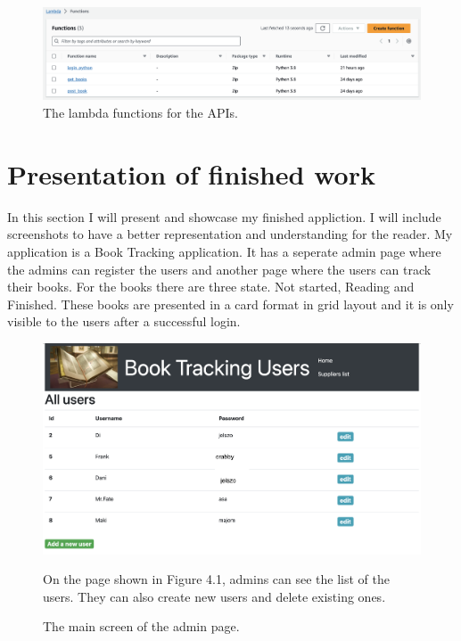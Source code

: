 \documentclass[11pt,a4paper,oneside]{report}
\begin{document}
\begin{figure}[!ht]
  \centering
  \includegraphics[scale=0.4]{lambda_functions.png}
  \caption{The lambda functions for the APIs.}
  \label{fig:TexnicCenter}
\end{figure}


\chapter{Presentation of finished work}

In this section I will present and showcase my finished appliction.
I will include screenshots to have a better representation and understanding for the reader.
My application is a Book Tracking application. It has a seperate admin page where the admins can register the users and another page where the users can track their books.
For the books there are three state. Not started, Reading and Finished. These books are presented in a card format in grid layout and it is only visible to the users after a successful login.


\begin{figure}[!ht]
  \begin{center}
    \includegraphics[scale=0.3]{admin_list.png}
    \caption{The main screen of the admin page.}
    \label{fig:TexnicCenter}
  \end{center}
  On the page shown in Figure 4.1, admins can see the list of the users. They can also create new users and delete existing ones.
\end{figure}
\end{document}
